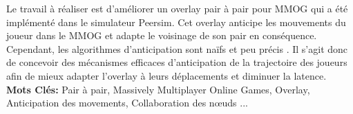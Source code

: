 		Le travail à réaliser est d'améliorer un overlay pair à pair pour MMOG qui a été implémenté dans le simulateur Peersim. Cet overlay anticipe les mouvements du joueur dans le MMOG et adapte le voisinage de son pair en conséquence. Cependant, les algorithmes d’anticipation sont naïfs et peu précis .
Il s’agit donc de concevoir des mécanismes efficaces d’anticipation de la trajectoire des joueurs afin de mieux adapter l’overlay à leurs déplacements et diminuer la latence.\\

\textbf{Mots Clés:} Pair à pair, Massively Multiplayer Online Games, Overlay, Anticipation des movements, Collaboration des nœuds ...
